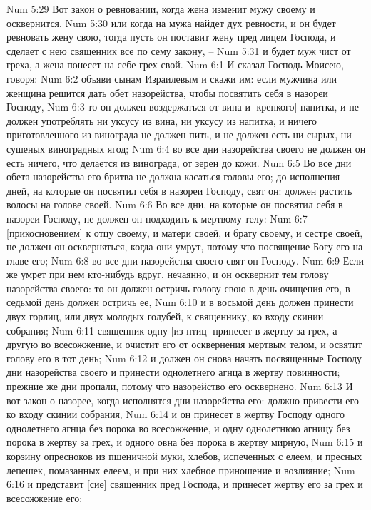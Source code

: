 Num 5:29  Вот закон о ревновании, когда жена изменит мужу своему и осквернится,
Num 5:30  или когда на мужа найдет дух ревности, и он будет ревновать жену свою, тогда пусть он поставит жену пред лицем Господа, и сделает с нею священник все по сему закону, --
Num 5:31  и будет муж чист от греха, а жена понесет на себе грех свой.
Num 6:1  И сказал Господь Моисею, говоря:
Num 6:2  объяви сынам Израилевым и скажи им: если мужчина или женщина решится дать обет назорейства, чтобы посвятить себя в назореи Господу,
Num 6:3  то он должен воздержаться от вина и [крепкого] напитка, и не должен употреблять ни уксусу из вина, ни уксусу из напитка, и ничего приготовленного из винограда не должен пить, и не должен есть ни сырых, ни сушеных виноградных ягод;
Num 6:4  во все дни назорейства своего не должен он есть ничего, что делается из винограда, от зерен до кожи.
Num 6:5  Во все дни обета назорейства его бритва не должна касаться головы его; до исполнения дней, на которые он посвятил себя в назореи Господу, свят он: должен растить волосы на голове своей.
Num 6:6  Во все дни, на которые он посвятил себя в назореи Господу, не должен он подходить к мертвому телу:
Num 6:7  [прикосновением] к отцу своему, и матери своей, и брату своему, и сестре своей, не должен он оскверняться, когда они умрут, потому что посвящение Богу его на главе его;
Num 6:8  во все дни назорейства своего свят он Господу.
Num 6:9  Если же умрет при нем кто-нибудь вдруг, нечаянно, и он осквернит тем голову назорейства своего: то он должен остричь голову свою в день очищения его, в седьмой день должен остричь ее,
Num 6:10  и в восьмой день должен принести двух горлиц, или двух молодых голубей, к священнику, ко входу скинии собрания;
Num 6:11  священник одну [из птиц] принесет в жертву за грех, а другую во всесожжение, и очистит его от осквернения мертвым телом, и освятит голову его в тот день;
Num 6:12  и должен он снова начать посвященные Господу дни назорейства своего и принести однолетнего агнца в жертву повинности; прежние же дни пропали, потому что назорейство его осквернено.
Num 6:13  И вот закон о назорее, когда исполнятся дни назорейства его: должно привести его ко входу скинии собрания,
Num 6:14  и он принесет в жертву Господу одного однолетнего агнца без порока во всесожжение, и одну однолетнюю агницу без порока в жертву за грех, и одного овна без порока в жертву мирную,
Num 6:15  и корзину опресноков из пшеничной муки, хлебов, испеченных с елеем, и пресных лепешек, помазанных елеем, и при них хлебное приношение и возлияние;
Num 6:16  и представит [сие] священник пред Господа, и принесет жертву его за грех и всесожжение его;
